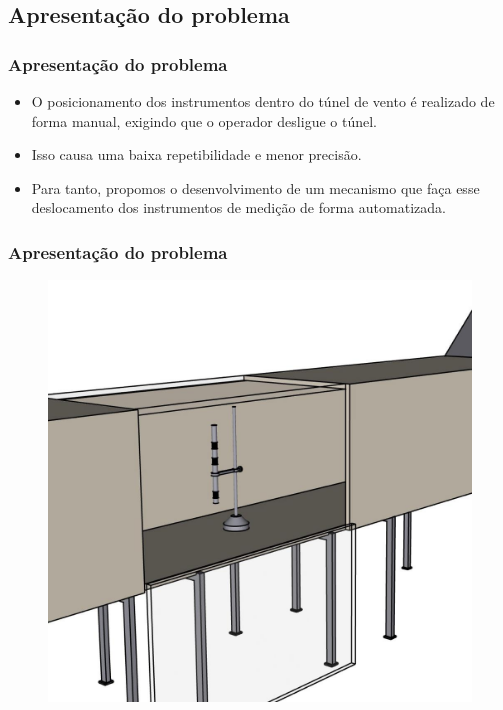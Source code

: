 \subsection{Apresentação do problema}

\begin{frame}
\frametitle{Apresentação do problema}
\begin{itemize}
    \item O posicionamento dos instrumentos dentro do túnel de vento é realizado de forma manual, exigindo que o operador desligue o túnel.
    \item Isso causa uma baixa repetibilidade e menor precisão. 
    \item Para tanto, propomos o desenvolvimento de um mecanismo que faça esse deslocamento dos instrumentos de medição de forma automatizada.
\end{itemize}
\end{frame}

\begin{frame}
    \frametitle{Apresentação do problema}
        \begin{figure}
        \centering
        \includegraphics[scale = 0.15]{figuras/sisantigozoom}
        \end{figure}
\end{frame}
    